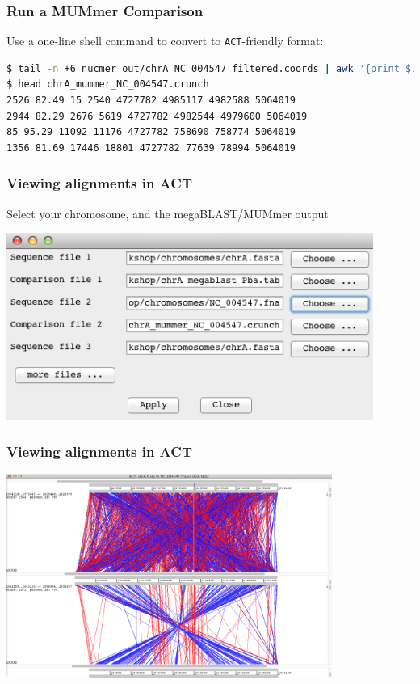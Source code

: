 \documentclass[table]{beamer}
\begin{document}
  \begin{frame}[fragile]
    \frametitle{Run a MUMmer Comparison}
    Use a one-line shell command to convert to \texttt{ACT}-friendly format:
    \begin{lstlisting}[language=bash]
$ tail -n +6 nucmer_out/chrA_NC_004547_filtered.coords | awk '{print $7" "$10" "$1" "$2" "$12" "$4" "$5" "$13}' > chrA_mummer_NC_004547.crunch
$ head chrA_mummer_NC_004547.crunch 
2526 82.49 15 2540 4727782 4985117 4982588 5064019
2944 82.29 2676 5619 4727782 4982544 4979600 5064019
85 95.29 11092 11176 4727782 758690 758774 5064019
1356 81.69 17446 18801 4727782 77639 78994 5064019
    \end{lstlisting}
\end{frame}  

    \begin{frame}
      \frametitle{Viewing alignments in ACT}    
      Select your chromosome, and the megaBLAST/MUMmer output
      \begin{center}
        \includegraphics[width=0.9\textwidth]{images/act_wgs8}     
      \end{center}
    \end{frame} 

    \begin{frame}
      \frametitle{Viewing alignments in ACT}    
      \begin{center}
        \includegraphics[width=0.8\textwidth]{images/act_wgs9}     
      \end{center}
    \end{frame} 
\end{document}
